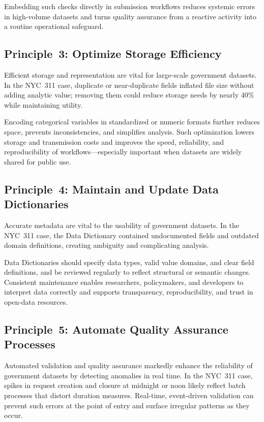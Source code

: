 \documentclass[linenumber]{jdsart}
\begin{document}
Embedding such checks directly in submission workflows reduces systemic 
errors in high-volume datasets and turns quality assurance from a reactive 
activity into a routine operational safeguard.


\subsection{Principle~3: Optimize Storage Efficiency}
\label{subsec:principle3}
Efficient storage and representation are vital for large-scale government 
datasets.  
In the \textsc{NYC~311} case, duplicate or near-duplicate fields inflated 
file size without adding analytic value; removing them could reduce storage 
needs by nearly 40\% while maintaining utility.  

Encoding categorical variables in standardized or numeric formats further 
reduces space, prevents inconsistencies, and simplifies analysis.  
Such optimization lowers storage and transmission costs and improves the 
speed, reliability, and reproducibility of workflows—especially important 
when datasets are widely shared for public use.


\subsection{Principle~4: Maintain and Update Data Dictionaries}
\label{subsec:principle4}
Accurate metadata are vital to the usability of government datasets.  
In the \textsc{NYC~311} case, the Data Dictionary contained undocumented 
fields and outdated domain definitions, creating ambiguity and complicating 
analysis.  

Data Dictionaries should specify data types, valid value domains, and clear 
field definitions, and be reviewed regularly to reflect structural or 
semantic changes.  
Consistent maintenance enables researchers, policymakers, and developers to 
interpret data correctly and supports transparency, reproducibility, and 
trust in open-data resources.


\subsection{Principle~5: Automate Quality Assurance Processes}
\label{subsec:principle5}
Automated validation and quality assurance markedly enhance the reliability 
of government datasets by detecting anomalies in real time.  
In the \textsc{NYC~311} case, spikes in request creation and closure at 
midnight or noon likely reflect batch processes that distort duration 
measures.  Real-time, event-driven validation can prevent such errors at the 
point of entry and surface irregular patterns as they occur.  
\end{document}
